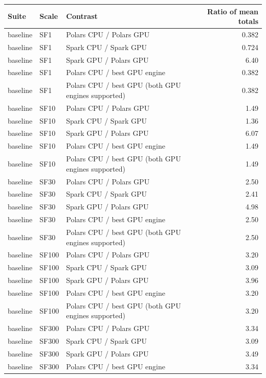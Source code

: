 \begin{tabular}{lllr}
\toprule
Suite & Scale & Contrast & Ratio of mean totals \\
\midrule
baseline & SF1 & Polars CPU / Polars GPU & 0.382 \\
baseline & SF1 & Spark CPU / Spark GPU & 0.724 \\
baseline & SF1 & Spark GPU / Polars GPU & 6.40 \\
baseline & SF1 & Polars CPU / best GPU engine & 0.382 \\
baseline & SF1 & Polars CPU / best GPU (both GPU engines supported) & 0.382 \\
baseline & SF10 & Polars CPU / Polars GPU & 1.49 \\
baseline & SF10 & Spark CPU / Spark GPU & 1.36 \\
baseline & SF10 & Spark GPU / Polars GPU & 6.07 \\
baseline & SF10 & Polars CPU / best GPU engine & 1.49 \\
baseline & SF10 & Polars CPU / best GPU (both GPU engines supported) & 1.49 \\
baseline & SF30 & Polars CPU / Polars GPU & 2.50 \\
baseline & SF30 & Spark CPU / Spark GPU & 2.41 \\
baseline & SF30 & Spark GPU / Polars GPU & 4.98 \\
baseline & SF30 & Polars CPU / best GPU engine & 2.50 \\
baseline & SF30 & Polars CPU / best GPU (both GPU engines supported) & 2.50 \\
baseline & SF100 & Polars CPU / Polars GPU & 3.20 \\
baseline & SF100 & Spark CPU / Spark GPU & 3.09 \\
baseline & SF100 & Spark GPU / Polars GPU & 3.96 \\
baseline & SF100 & Polars CPU / best GPU engine & 3.20 \\
baseline & SF100 & Polars CPU / best GPU (both GPU engines supported) & 3.20 \\
baseline & SF300 & Polars CPU / Polars GPU & 3.34 \\
baseline & SF300 & Spark CPU / Spark GPU & 3.09 \\
baseline & SF300 & Spark GPU / Polars GPU & 3.49 \\
baseline & SF300 & Polars CPU / best GPU engine & 3.34 \\

\end{tabular}
